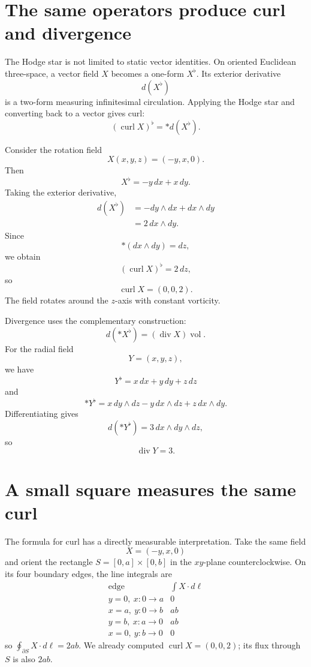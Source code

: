 \section{The same operators produce curl and divergence}

The Hodge star is not limited to static vector identities.  On oriented Euclidean three-space, a vector field \(X\) becomes a one-form \(X^{\flat}\).  Its exterior derivative
\[
  d(X^{\flat})
\]
is a two-form measuring infinitesimal circulation.  Applying the Hodge star and converting back to a vector gives curl:
\[
  \boxed{
  (\operatorname{curl}X)^{\flat}
  =*d(X^{\flat}).}
\]

Consider the rotation field
\[
  X(x,y,z)=(-y,x,0).
\]
Then
\[
  X^{\flat}=-y\,dx+x\,dy.
\]
Taking the exterior derivative,
\[
\begin{aligned}
  d(X^{\flat})
  &=-dy\wedge dx+dx\wedge dy\\
  &=2\,dx\wedge dy.
\end{aligned}
\]
Since
\[
  *(dx\wedge dy)=dz,
\]
we obtain
\[
  (\operatorname{curl}X)^{\flat}=2\,dz,
\]
so
\[
  \operatorname{curl}X=(0,0,2).
\]
The field rotates around the \(z\)-axis with constant vorticity.

Divergence uses the complementary construction:
\[
  d(*X^{\flat})
  =(\operatorname{div}X)\operatorname{vol}.
\]
For the radial field
\[
  Y=(x,y,z),
\]
we have
\[
  Y^{\flat}=x\,dx+y\,dy+z\,dz
\]
and
\[
  *Y^{\flat}
  =x\,dy\wedge dz-y\,dx\wedge dz+z\,dx\wedge dy.
\]
Differentiating gives
\[
  d(*Y^{\flat})
  =3\,dx\wedge dy\wedge dz,
\]
so
\[
  \operatorname{div}Y=3.
\]

\section{A small square measures the same curl}

The formula for curl has a directly measurable interpretation. Take the same field
\[
 X=(-y,x,0)
\]
and orient the rectangle $S=[0,a]\times[0,b]$ in the $xy$-plane counterclockwise. On its four boundary edges, the line integrals are
\[
 \begin{array}{c|c}
 \text{edge} & \displaystyle\int X\cdot d\ell\\ \hline
 y=0,\ x:0\to a&0\\
 x=a,\ y:0\to b&ab\\
 y=b,\ x:a\to0&ab\\
 x=0,\ y:b\to0&0
 \end{array}
\]
so $\oint_{\partial S}X\cdot d\ell=2ab$. We already computed $\operatorname{curl}X=(0,0,2)$; its flux through $S$ is also $2ab$.

